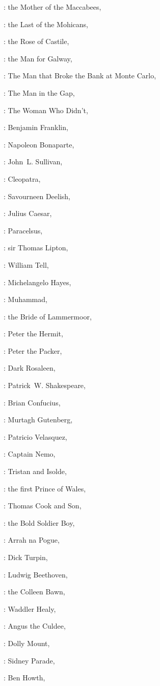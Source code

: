 :
the Mother of the Maccabees,

:
the Last of the Mohicans,

:
the Rose of Castile,

:
the Man for Galway,

:
The Man that Broke the Bank at Monte Carlo,

:
The Man in the Gap,

:
The Woman Who Didn't,

:
Benjamin Franklin,

:
Napoleon Bonaparte,

:
John~L. Sullivan,

:
Cleopatra,

:
Savourneen Deelish,

:
Julius Caesar,

:
Paracelsus,

:
sir Thomas Lipton,

:
William Tell,

:
Michelangelo Hayes,

:
Muhammad,

:
the Bride of Lammermoor,

:
Peter the Hermit,

:
Peter the Packer,

:
Dark Rosaleen,

:
Patrick~W. Shakespeare,

:
Brian Confucius,

:
Murtagh Gutenberg,

:
Patricio Velasquez,

:
Captain Nemo,

:
Tristan and Isolde,

:
the first Prince of Wales,

:
Thomas Cook and Son,

:
the Bold Soldier Boy,

:
Arrah na Pogue,

:
Dick Turpin,

:
Ludwig Beethoven,

:
the Colleen Bawn,

:
Waddler Healy,

:
Angus the Culdee,

:
Dolly Mount,

:
Sidney Parade,

:
Ben Howth,

